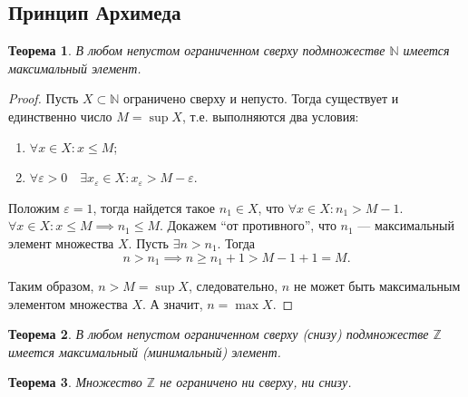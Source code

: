 \documentclass[a4paper,12pt]{article} %
\newtheorem{theorem}{Теорема}[section]
\theoremstyle{remark}
\theoremstyle{definition}
\begin{document}
\subsection{Принцип Архимеда}
\begin{theorem}
    В любом непустом ограниченном сверху подмножестве $\mathbb{N}$ имеется максимальный элемент.
\end{theorem}
\begin{proof}
    Пусть $X\subset \mathbb{N}$ ограничено сверху и непусто. Тогда существует и единственно число $M = \sup X$,
    т.е. выполняются два условия:
    \begin{enumerate}
        \item $\forall x \in X : x \le M$;
        \item $\forall \varepsilon>0 \quad \exists x_\varepsilon \in X : x_\varepsilon > M - \varepsilon$.
    \end{enumerate}

    Положим $\varepsilon = 1$, тогда найдется такое $n_1\in X$, что $\forall x \in X : n_1 > M - 1$. 
    $\forall x \in X : x \le M \implies n_1 \le M$. Докажем ``от противного'',
    что $n_1$ --- максимальный элемент множества $X$. Пусть $\exists n > n_1$. Тогда 
    \[n > n_1 \implies n \ge n_1 + 1 > M - 1 + 1 = M.\] 

    Таким образом, $n > M = \sup X$, следовательно, $n$ не может быть максимальным элементом множества $X$.
    А значит, $n = \max X$.
\end{proof}

\begin{theorem}
    В любом непустом ограниченном сверху (снизу) подмножестве $\mathbb{Z}$ имеется максимальный (минимальный) элемент.
\end{theorem}

\begin{theorem}
    Множество $\mathbb{Z}$ не ограничено ни сверху, ни снизу.
\end{theorem}
\end{document}
